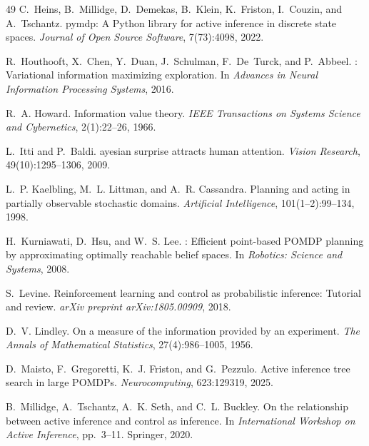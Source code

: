 \documentclass[runningheads]{llncs}
\begin{document}
\begin{thebibliography}{49}
C.~Heins, B.~Millidge, D.~Demekas, B.~Klein, K.~Friston, I.~Couzin, and A.~Tschantz.
\newblock pymdp: A {P}ython library for active inference in discrete state spaces.
\newblock \emph{Journal of Open Source Software}, 7(73):4098, 2022.

R.~Houthooft, X.~Chen, Y.~Duan, J.~Schulman, F.~De~Turck, and P.~Abbeel.
: Variational information maximizing exploration.
\newblock In \emph{Advances in Neural Information Processing Systems}, 2016.

R.~A. Howard.
\newblock Information value theory.
\newblock \emph{IEEE Transactions on Systems Science and Cybernetics}, 2(1):22--26, 1966.

L.~Itti and P.~Baldi.
ayesian surprise attracts human attention.
\newblock \emph{Vision Research}, 49(10):1295--1306, 2009.

L.~P. Kaelbling, M.~L. Littman, and A.~R. Cassandra.
\newblock Planning and acting in partially observable stochastic domains.
\newblock \emph{Artificial Intelligence}, 101(1--2):99--134, 1998.

H.~Kurniawati, D.~Hsu, and W.~S. Lee.
: Efficient point-based {POMDP} planning by approximating optimally reachable belief spaces.
\newblock In \emph{Robotics: Science and Systems}, 2008.

S.~Levine.
\newblock Reinforcement learning and control as probabilistic inference: Tutorial and review.
\newblock \emph{arXiv preprint arXiv:1805.00909}, 2018.

D.~V. Lindley.
\newblock On a measure of the information provided by an experiment.
\newblock \emph{The Annals of Mathematical Statistics}, 27(4):986--1005, 1956.

D.~Maisto, F.~Gregoretti, K.~J. Friston, and G.~Pezzulo.
\newblock Active inference tree search in large {POMDP}s.
\newblock \emph{Neurocomputing}, 623:129319, 2025.

B.~Millidge, A.~Tschantz, A.~K. Seth, and C.~L. Buckley.
\newblock On the relationship between active inference and control as inference.
\newblock In \emph{International Workshop on Active Inference}, pp.\ 3--11. Springer, 2020.


\end{thebibliography}
\end{document}
